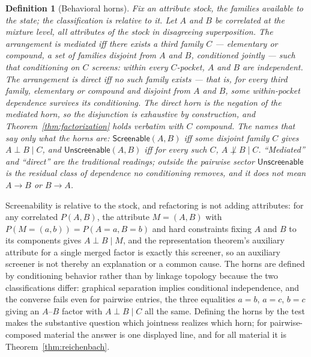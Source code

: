 \documentclass[11pt]{article}
\newtheorem{definition}{Definition}
\begin{document}
\begin{definition}[Behavioral horns]
\label{def:horns}
Fix an attribute stock, the families available to the state; the classification is relative to it. Let $A$ and $B$ be correlated at the mixture level, all attributes of the stock in disagreeing superposition. The arrangement is \emph{mediated} iff there exists a third family $C$ --- elementary or compound, a set of families disjoint from $A$ and $B$, conditioned jointly --- such that conditioning on $C$ screens: within every $C$-pocket, $A$ and $B$ are independent. The arrangement is \emph{direct} iff no such family exists --- that is, for \emph{every} third family, elementary or compound and disjoint from $A$ and $B$, some within-pocket dependence survives its conditioning. The direct horn is the negation of the mediated horn, so the disjunction is exhaustive by construction, and Theorem~\ref{thm:factorization} holds verbatim with $C$ compound. The names that say only what the horns are: $\mathsf{Screenable}(A, B)$ iff some disjoint family $C$ gives $A \perp B \mid C$, and $\mathsf{Unscreenable}(A, B)$ iff for every such $C$, $A \not\perp B \mid C$. ``Mediated'' and ``direct'' are the traditional readings; outside the pairwise sector $\mathsf{Unscreenable}$ is the residual class of dependence no conditioning removes, and it does not mean $A \to B$ or $B \to A$.
\end{definition}

\noindent Screenability is relative to the stock, and refactoring is not adding attributes: for any correlated $P(A, B)$, the attribute $M = (A, B)$ with $P(M = (a, b)) = P(A = a, B = b)$ and hard constraints fixing $A$ and $B$ to its components gives $A \perp B \mid M$, and the representation theorem's auxiliary attribute for a single merged factor is exactly this screener, so an auxiliary screener is not thereby an explanation or a common cause. The horns are defined by conditioning behavior rather than by linkage topology because the two classifications differ: graphical separation implies conditional independence, and the converse fails even for pairwise entries, the three equalities $a = b$, $a = c$, $b = c$ giving an $A$--$B$ factor with $A \perp B \mid C$ all the same. Defining the horns by the test makes the substantive question which jointness realizes which horn; for pairwise-composed material the answer is one displayed line, and for all material it is Theorem~\ref{thm:reichenbach}.
\end{document}
